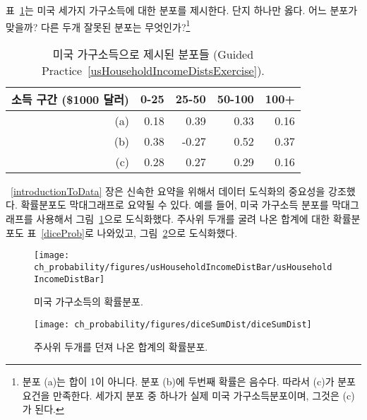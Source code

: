 \begin{exercise}\label{usHouseholdIncomeDistsExercise}
표~\ref{usHouseholdIncomeDists}는 미국 세가지 가구소득에 대한 분포를 제시한다. 단지 하나만 옳다. 어느 분포가 맞을까? 다른 두개 잘못된 분포는 무엇인가?\footnote{분포 (a)는 합이 1이 아니다. 분포 (b)에 두번째 확률은 음수다. 따라서 (c)가 분포 요건을 만족한다. 세가지 분포 중 하나가 실제 미국 가구소득분포이며, 그것은 (c)가 된다.}
\end{exercise}

\begin{table}
\centering
\begin{tabular}{r | rr rr}
  \hline
소득 구간 (\$1000 달러) & 0-25    & 25-50    & 50-100     & 100+    \\
  \hline
(a)\hspace{0.2mm}	 & 0.18 & 0.39 & 0.33 & 0.16 \\
(b)				 & 0.38 & -0.27 & 0.52 & 0.37 \\
(c)\hspace{0.2mm}	 & 0.28 & 0.27 & 0.29 & 0.16 \\
  \hline
\end{tabular}
\caption{미국 가구소득으로 제시된 분포들 (Guided Practice~\ref{usHouseholdIncomeDistsExercise}).}
\label{usHouseholdIncomeDists}
\end{table}

~\ref{introductionToData} 장은  신속한 요약을 위해서 데이터 도식화의 중요성을 강조했다. 확률분포도 막대그래프로 요약될 수 있다. 예를 들어, 미국 가구소득 분포를 막대그래프를 사용해서 그림~\ref{usHouseholdIncomeDistBar}으로 도식화했다.  주사위 두개를 굴려 나온 합계에 대한 확률분포도 표~\ref{diceProb}로 나와있고, 그림~\ref{diceSumDist}으로 도식화했다. %

\begin{figure}
\centering
\texttt{[image: ch\_probability/figures/usHouseholdIncomeDistBar/usHouseholdIncomeDistBar]}
\caption{미국 가구소득의 확률분포.}
\label{usHouseholdIncomeDistBar}
\end{figure}

\begin{figure}
\centering
\texttt{[image: ch\_probability/figures/diceSumDist/diceSumDist]}
\caption{주사위 두개를 던져 나온 합계의 확률분포.}
\label{diceSumDist}
\end{figure}


